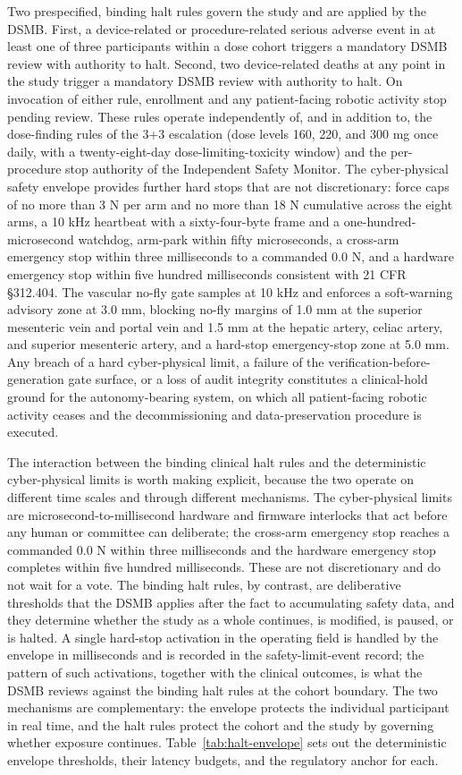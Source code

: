 Two prespecified, binding halt rules govern the study and are applied by the DSMB.
First, a device-related or procedure-related serious adverse event in at least one
of three participants within a dose cohort triggers a mandatory DSMB review with
authority to halt. Second, two device-related deaths at any point in the study
trigger a mandatory DSMB review with authority to halt. On invocation of either
rule, enrollment and any patient-facing robotic activity stop pending review. These
rules operate independently of, and in addition to, the dose-finding rules of the
3+3 escalation (dose levels 160, 220, and 300 mg once daily, with a twenty-eight-day
dose-limiting-toxicity window) and the per-procedure stop authority of the
Independent Safety Monitor. The cyber-physical safety envelope provides further
hard stops that are not discretionary: force caps of no more than 3 N per arm and no
more than 18 N cumulative across the eight arms, a 10 kHz heartbeat with a
sixty-four-byte frame and a one-hundred-microsecond watchdog, arm-park within fifty
microseconds, a cross-arm emergency stop within three milliseconds to a commanded
0.0 N, and a hardware emergency stop within five hundred milliseconds consistent
with 21 CFR \S 312.404. The vascular no-fly gate samples at 10 kHz and enforces a
soft-warning advisory zone at 3.0 mm, blocking no-fly margins of 1.0 mm at the
superior mesenteric vein and portal vein and 1.5 mm at the hepatic artery, celiac
artery, and superior mesenteric artery, and a hard-stop emergency-stop zone at 5.0
mm. Any breach of a hard cyber-physical limit, a failure of the
verification-before-generation gate surface, or a loss of audit integrity
constitutes a clinical-hold ground for the autonomy-bearing system, on which all
patient-facing robotic activity ceases and the decommissioning and data-preservation
procedure is executed.

The interaction between the binding clinical halt rules and the deterministic
cyber-physical limits is worth making explicit, because the two operate on different
time scales and through different mechanisms. The cyber-physical limits are
microsecond-to-millisecond hardware and firmware interlocks that act before any human
or committee can deliberate; the cross-arm emergency stop reaches a commanded 0.0 N
within three milliseconds and the hardware emergency stop completes within five
hundred milliseconds. These are not discretionary and do not wait for a vote. The
binding halt rules, by contrast, are deliberative thresholds that the DSMB applies
after the fact to accumulating safety data, and they determine whether the study as a
whole continues, is modified, is paused, or is halted. A single hard-stop activation
in the operating field is handled by the envelope in milliseconds and is recorded in
the safety-limit-event record; the pattern of such activations, together with the
clinical outcomes, is what the DSMB reviews against the binding halt rules at the
cohort boundary. The two mechanisms are complementary: the envelope protects the
individual participant in real time, and the halt rules protect the cohort and the
study by governing whether exposure continues. Table~\ref{tab:halt-envelope} sets out
the deterministic envelope thresholds, their latency budgets, and the regulatory
anchor for each.

